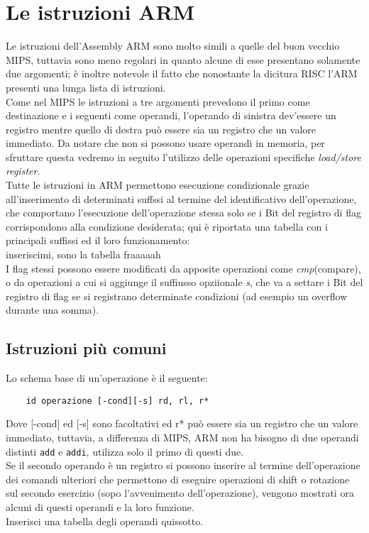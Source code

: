 \documentclass[class=book, crop=false]{standalone}
\begin{document}
\section{Le istruzioni ARM}
Le istruzioni dell'Assembly ARM sono molto simili a quelle del buon vecchio MIPS, tuttavia sono meno regolari in quanto alcune di esse presentano solamente due argomenti; è inoltre notevole il fatto che nonostante la dicitura RISC l'ARM presenti una lunga lista di istruzioni.\\
Come nel MIPS le istruzioni a tre argomenti prevedono il primo come destinazione e i seguenti come operandi, l'operando di sinistra dev'essere un registro mentre quello di destra può essere sia un registro che un valore immediato. Da notare che non si possono usare operandi in memoria, per sfruttare questa vedremo in seguito l'utilizzo delle operazioni specifiche \emph{load/store register}.\\
Tutte le istruzioni in ARM permettono esecuzione condizionale grazie all'inserimento di determinati suffssi al termine del identificativo dell'operazione, che comportano l'esecuzione dell'operazione stessa solo se i Bit del registro di flag corrispondono alla condizione desiderata; qui è riportata una tabella con i principali suffissi ed il loro funzionamento:\\
inseriscimi, sono la tabella fraaaaah\\
I flag stessi possono essere modificati da apposite operazioni come \emph{cmp}(compare), o da operazioni a cui si aggiunge il suffiusso opziionale \emph{s}, che va a settare i Bit del registro di flag se si registrano determinate condizioni (ad esempio un overflow durante una somma).\\

\subsection*{Istruzioni più comuni}
Lo schema base di un'operazione è il seguente:

\begin{verbatim}
	id operazione [-cond][-s] rd, rl, r*
\end{verbatim}

Dove [-cond] ed [-s] sono facoltativi ed r* può essere sia un registro che un valore immediato, tuttavia, a differenza di MIPS, ARM non ha bisogno di due operandi distinti \texttt{add} e \texttt{addi}, utilizza solo il primo di questi due.\\
Se il secondo operando è un registro si possono inserire al termine dell'operazione dei comandi ulteriori che permettono di eseguire operazioni di shift o rotazione sul secondo esercizio (sopo l'avvenimento dell'operazione), vengono mostrati ora alcuni di questi operandi e la loro funzione.\\
Inserisci una tabella degli operandi quissotto.\\
\end{document}
